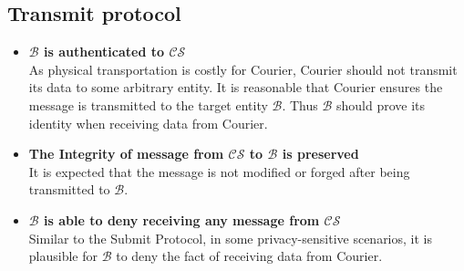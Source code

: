 \subsection{Transmit protocol}
\begin{itemize}
\item \textbf{$\mathcal{B}$ is authenticated to $\mathcal{CS}$ } \\
As physical transportation is costly for Courier, Courier should not transmit its data to some arbitrary entity. It is reasonable that Courier ensures the message is transmitted to the target entity $ \mathcal{B} $. Thus $ \mathcal{B} $
should prove its identity when receiving data from Courier.

\item \textbf{The Integrity of message from $\mathcal{CS}$ to $\mathcal{B}$ is preserved} \\
It is expected that the message is not modified or forged after being transmitted to $ \mathcal{B} $.

\item \textbf{$\mathcal{B}$ is able to deny receiving any message from $\mathcal{CS}$} \\
Similar to the Submit Protocol, in some privacy-sensitive scenarios, it is plausible for $ \mathcal{B} $ to deny the fact of receiving data from Courier.
\end{itemize}

